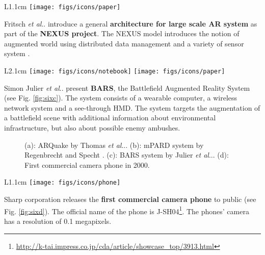 \documentclass[12pt,a4paper]{article}
\makeatletter
\DeclareRobustCommand\onedot{\futurelet\@let@token\@onedot}
\def\@onedot{\ifx\@let@token.\else.\null\fi\xspace}
\def\etal{\emph{et al}\onedot}
\makeatother
\begin{document}
\vspace{0.1in}

\begin{wrapfigure}{L}{1.1cm}
	\vspace{-10pt}	
	\texttt{[image: figs/icons/paper]}
	\vspace{-10pt}		
\end{wrapfigure}
\noindent Fritsch \etal introduce a general \textbf{architecture for large scale AR system} as part of the \textbf{NEXUS project}. The NEXUS model introduces the notion of augmented world using distributed data management and a variety of sensor system \cite{Fritsch01}.

\vspace{0.1in}

\begin{wrapfigure}{L}{2.1cm}
	\vspace{-10pt}	
	\texttt{[image: figs/icons/notebook]}
	\texttt{[image: figs/icons/paper]}	
	\vspace{-20pt}		
\end{wrapfigure}
\noindent Simon Julier \etal present \textbf{BARS}, the Battlefield Augmented Reality System \cite{Julier00} (see Fig. \ref{fig:sixc}). The system consists of a wearable computer, a wireless network system and a see-through HMD. The system targets the augmentation of a battlefield scene with additional information about environmental infrastructure, but also about possible enemy ambushes.

\begin{figure}[tbp]
\centering
\vspace{-50pt}
 \hfill
{} \hfill
{} \hfill
{} 
\vspace{-10pt}
\caption{(a): ARQuake by Thomas \etal \cite{Thomas00}. (b): mPARD system by Regenbrecht and Specht \cite{Regenbrecht00}. (c): BARS system by Julier \etal \cite{Julier00}. (d): First commercial camera phone in 2000.} \label{fig:six}
\end{figure}

\vspace{0.1in}

\begin{wrapfigure}{L}{1.1cm}
	\vspace{-0pt}	
	\texttt{[image: figs/icons/phone]}
	\vspace{-20pt}		
\end{wrapfigure}
\noindent Sharp corporation releases the \textbf{first commercial camera phone} to public (see Fig. \ref{fig:sixd}). The official name of the phone is J-SH04\footnote{\url{http://k-tai.impress.co.jp/cda/article/showcase_top/3913.html}}. The phones' camera has a resolution of 0.1 megapixels.
\end{document}
